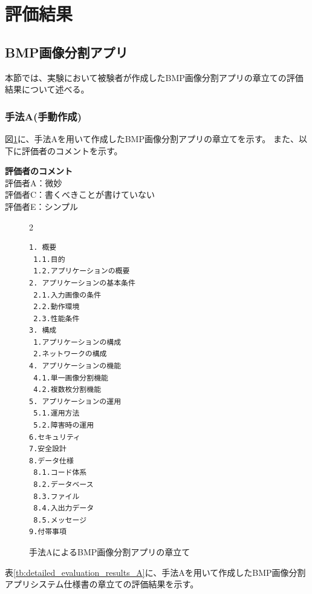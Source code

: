 \section{評価結果}
\label{sec:evaluation_results}

\subsection{BMP画像分割アプリ}
本節では、実験において被験者が作成したBMP画像分割アプリの章立ての評価結果について述べる。

\subsubsection{手法A(手動作成)}

図\ref{fig:A_chapter_structure_of_bmp_app}に、手法Aを用いて作成したBMP画像分割アプリの章立てを示す。
また、以下に評価者のコメントを示す。

\noindent\textbf{評価者のコメント}\\
評価者A：微妙\\
評価者C：書くべきことが書けていない\\
評価者E：シンプル\\


\begin{figure}[tp]
\begin{tcolorbox}[
  colback=white,
  colframe=orange,
  fonttitle=\bfseries
]
\begin{multicols}{2}
\footnotesize
\ttfamily
\fontsize{8}{9}\selectfont
\begin{verbatim}
1. 概要
 1.1.目的
 1.2.アプリケーションの概要
2. アプリケーションの基本条件
 2.1.入力画像の条件
 2.2.動作環境
 2.3.性能条件
3. 構成
 1.アプリケーションの構成
 2.ネットワークの構成
4. アプリケーションの機能
 4.1.単一画像分割機能
 4.2.複数枚分割機能
5. アプリケーションの運用
 5.1.運用方法
 5.2.障害時の運用
6.セキュリティ
7.安全設計
8.データ仕様
 8.1.コード体系
 8.2.データベース
 8.3.ファイル
 8.4.入出力データ
 8.5.メッセージ
9.付帯事項
\end{verbatim}
\end{multicols}
\end{tcolorbox}
\caption{手法AによるBMP画像分割アプリの章立て}
\label{fig:A_chapter_structure_of_bmp_app}
\end{figure}

表\ref{tb:detailed_evaluation_results_A}に、手法Aを用いて作成したBMP画像分割アプリシステム仕様書の章立ての評価結果を示す。

